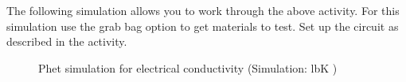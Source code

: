\label{m38706*eip-316}The following simulation allows you to work through the above activity. For this simulation use the grab bag option to get materials to test. Set up the circuit as described in the activity.
    \setcounter{subfigure}{0}
	\begin{figure}[H] %
    \textnormal{Phet simulation for electrical conductivity}\nopagebreak
  \label{m38806*phet!!!underscore!!!sim}\label{m38806*phet-simulation}
             { (Simulation:  lbK )}
 \end{figure}    
        \par 
    \label{m38706*cid7}
